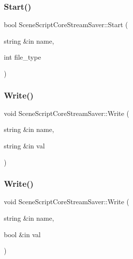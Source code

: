 \subsubsection{\texorpdfstring{Start()}{Start()}}
{\footnotesize\ttfamily bool Scene\+Script\+Core\+Stream\+Saver\+::\+Start (\begin{DoxyParamCaption}\item[{string \&in}]{name,  }\item[{int}]{file\+\_\+type }\end{DoxyParamCaption})}

\hypertarget{class_scene_script_core_stream_saver_ac95b305906b61bbff9589888d4cffff5}{}\label{class_scene_script_core_stream_saver_ac95b305906b61bbff9589888d4cffff5} 
\subsubsection{\texorpdfstring{Write()}{Write()}\hspace{0.1cm}{\footnotesize\ttfamily [1/6]}}
{\footnotesize\ttfamily void Scene\+Script\+Core\+Stream\+Saver\+::\+Write (\begin{DoxyParamCaption}\item[{string \&in}]{name,  }\item[{string \&in}]{val }\end{DoxyParamCaption})}

\hypertarget{class_scene_script_core_stream_saver_ab73960b3fec1824762a18dec89c01931}{}\label{class_scene_script_core_stream_saver_ab73960b3fec1824762a18dec89c01931} 
\subsubsection{\texorpdfstring{Write()}{Write()}\hspace{0.1cm}{\footnotesize\ttfamily [2/6]}}
{\footnotesize\ttfamily void Scene\+Script\+Core\+Stream\+Saver\+::\+Write (\begin{DoxyParamCaption}\item[{string \&in}]{name,  }\item[{bool \&in}]{val }\end{DoxyParamCaption})}

